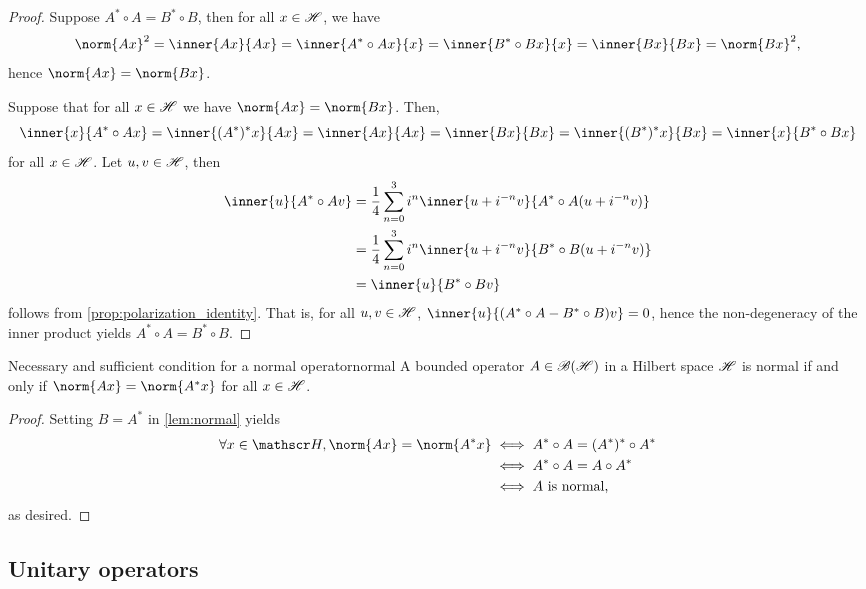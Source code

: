 \begin{proof}
    Suppose \(A^* \circ A = B^* \circ B\), then for all \(x \in \mathscr{H}\), we have
    \begin{equation*}
        \norm{Ax}^2 = \inner{Ax}{Ax} = \inner{A^*\circ Ax}{x} = \inner{B^*\circ Bx}{x} = \inner{Bx}{Bx} = \norm{Bx}^2,
    \end{equation*}
    hence \(\norm{Ax} = \norm{Bx}\).

    Suppose that for all \(x \in \mathscr{H}\) we have \(\norm{Ax} = \norm{Bx}\). Then,
    \begin{equation*}
        \inner{x}{A^* \circ Ax} = \inner{(A^*)^*x}{Ax} = \inner{Ax}{Ax} = \inner{Bx}{Bx} = \inner{(B^*)^*x}{Bx} = \inner{x}{B^* \circ Bx}
    \end{equation*}
    for all \(x \in \mathscr{H}\). Let \(u, v \in \mathscr{H}\), then
    \begin{align*}
        \inner{u}{A^* \circ A v} &= \frac14\sum_{n=0}^3 i^n\inner{u + i^{-n}v}{A^*\circ A(u + i^{-n}v)}\\
                                 &= \frac14 \sum_{n=0}^3 i^n\inner{u + i^{-n}v}{B^* \circ B(u + i^{-n}v)}\\
                                 &= \inner{u}{B^* \circ B v}
    \end{align*}
    follows from \cref{prop:polarization_identity}. That is, for all \(u, v \in \mathscr{H}\), \(\inner{u}{(A^*\circ A - B^*\circ B)v} = 0\), hence the non-degeneracy of the inner product yields \(A^*\circ A = B^*\circ B\).
\end{proof}

\begin{proposition}{Necessary and sufficient condition for a normal operator}{normal}
    A bounded operator \(A \in \mathscr{B}(\mathscr{H})\) in a Hilbert space \(\mathscr{H}\) is normal if and only if \(\norm{Ax} = \norm{A^* x}\) for all \(x \in \mathscr{H}\).
\end{proposition}
\begin{proof}
    Setting \(B = A^*\) in \cref{lem:normal} yields
    \begin{align*}
        \forall x \in \hilbert, \norm{Ax} = \norm{A^*x} &\iff A^*\circ A = (A^*)^*\circ A^*\\
                                                        &\iff A^* \circ A = A \circ A^*\\
                                                        &\iff A\text{ is normal,}
    \end{align*}
    as desired.
\end{proof}

\subsection{Unitary operators}
\todo
